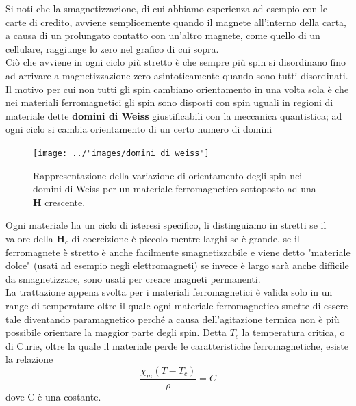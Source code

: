 \documentclass[
10pt, %
a4paper, %
oneside, %
headinclude,footinclude, %
BCOR5mm, %
]{scrartcl}
\begin{document}
\FloatBarrier
Si noti che la smagnetizzazione, di cui abbiamo esperienza ad esempio con le carte di credito, avviene semplicemente quando il magnete all'interno della carta, a causa di un prolungato contatto con un'altro magnete, come quello di un cellulare, raggiunge lo zero nel grafico di cui sopra.\\
Ciò che avviene in ogni ciclo più stretto è che sempre più spin si disordinano fino ad arrivare a magnetizzazione zero asintoticamente quando sono tutti disordinati. Il motivo per cui non tutti gli spin cambiano orientamento in una volta sola è che nei materiali ferromagnetici gli spin sono disposti con spin uguali in regioni di materiale dette \textbf{domini di Weiss} giustificabili con la meccanica quantistica; ad ogni ciclo si cambia orientamento di un certo numero di domini
\begin{figure}[h!]
	\centering
	\texttt{[image: ../"images/domini di weiss"]}
	\caption{Rappresentazione della variazione di orientamento degli spin nei domini di Weiss per un materiale ferromagnetico sottoposto ad una \(\mathbf{H}\) crescente.}
	\label{fig:domini-di-weiss}
\end{figure}
\FloatBarrier
Ogni materiale ha un ciclo di isteresi specifico, li distinguiamo in stretti se il valore della \(\mathbf{H}_c\) di coercizione è piccolo mentre larghi se è grande, se il ferromagnete è stretto è anche facilmente smagnetizzabile e viene detto "materiale dolce" (usati ad esempio negli elettromagneti) se invece è largo sarà anche difficile da smagnetizzare, sono usati per creare magneti permanenti.\\
La trattazione appena svolta per i materiali ferromagnetici è valida solo in un range di temperature oltre il quale ogni materiale ferromagnetico smette di essere tale diventando paramagnetico perché a causa dell'agitazione termica non è più possibile orientare la maggior parte degli spin. Detta \(T_c\) la temperatura critica, o di Curie, oltre la quale il materiale perde le caratteristiche ferromagnetiche, esiste la relazione
\[\frac{\chi_m(T-T_c)}{\rho} = C\] 
dove C è una costante. 
\end{document}

